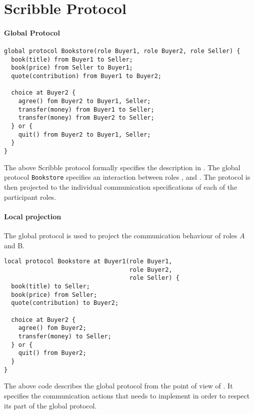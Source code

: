 \section{Scribble Protocol}

\paragraph{Global Protocol}
\begin{lstlisting}[caption={Global Protocol for Bookstore}]
global protocol Bookstore(role Buyer1, role Buyer2, role Seller) {
  book(title) from Buyer1 to Seller;
  book(price) from Seller to Buyer1;
  quote(contribution) from Buyer1 to Buyer2;

  choice at Buyer2 {
    agree() fom Buyer2 to Buyer1, Seller;
    transfer(money) from Buyer1 to Seller;
    transfer(money) from Buyer2 to Seller;
  } or {
    quit() from Buyer2 to Buyer1, Seller;
  }
}
\end{lstlisting}

The above Scribble protocol formally specifies
the description in .
The global protocol \lstinline|Bookstore| specifies
an interaction between roles \BuyerOne, \BuyerTwo and
\Seller. The protocol is then projected to the
individual communication specifications of each 
of the participant roles.



\paragraph{Local projection}
The global protocol is used to project the communication
behaviour of roles $A$ and B.


\begin{lstlisting}[caption={Local Protocol for Role \BuyerOne}]
local protocol Bookstore at Buyer1(role Buyer1,
                                   role Buyer2,
                                   role Seller) {
  book(title) to Seller;
  book(price) from Seller;
  quote(contribution) to Buyer2;

  choice at Buyer2 {
    agree() fom Buyer2;
    transfer(money) to Seller;
  } or {
    quit() from Buyer2;
  }
}
\end{lstlisting}

The above code describes the global protocol from the
point of view of \BuyerOne. It specifies the
communication actions that \BuyerOne needs to implement
in order to respect its part of the global protocol. 

